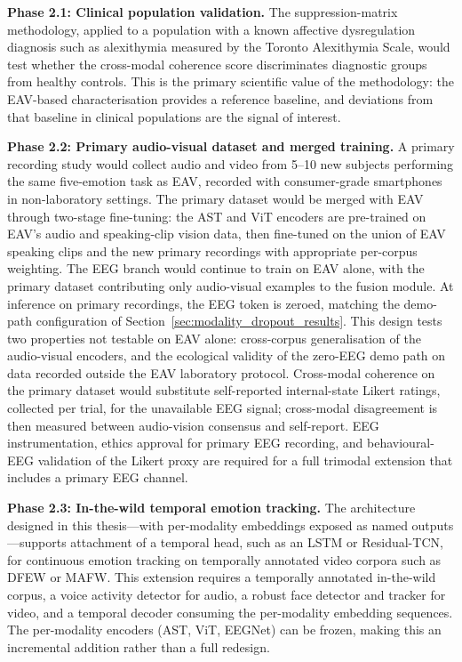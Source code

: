 \textbf{Phase 2.1: Clinical population validation.} The suppression-matrix methodology, applied to a population with a known affective dysregulation diagnosis such as alexithymia measured by the Toronto Alexithymia Scale, would test whether the cross-modal coherence score discriminates diagnostic groups from healthy controls. This is the primary scientific value of the methodology: the EAV-based characterisation provides a reference baseline, and deviations from that baseline in clinical populations are the signal of interest.

\textbf{Phase 2.2: Primary audio-visual dataset and merged training.} A primary recording study would collect audio and video from 5--10 new subjects performing the same five-emotion task as EAV, recorded with consumer-grade smartphones in non-laboratory settings. The primary dataset would be merged with EAV through two-stage fine-tuning: the AST and ViT encoders are pre-trained on EAV's audio and speaking-clip vision data, then fine-tuned on the union of EAV speaking clips and the new primary recordings with appropriate per-corpus weighting. The EEG branch would continue to train on EAV alone, with the primary dataset contributing only audio-visual examples to the fusion module. At inference on primary recordings, the EEG token is zeroed, matching the demo-path configuration of Section~\ref{sec:modality_dropout_results}. This design tests two properties not testable on EAV alone: cross-corpus generalisation of the audio-visual encoders, and the ecological validity of the zero-EEG demo path on data recorded outside the EAV laboratory protocol. Cross-modal coherence on the primary dataset would substitute self-reported internal-state Likert ratings, collected per trial, for the unavailable EEG signal; cross-modal disagreement is then measured between audio-vision consensus and self-report. EEG instrumentation, ethics approval for primary EEG recording, and behavioural-EEG validation of the Likert proxy are required for a full trimodal extension that includes a primary EEG channel.

\textbf{Phase 2.3: In-the-wild temporal emotion tracking.} The architecture designed in this thesis---with per-modality embeddings exposed as named outputs---supports attachment of a temporal head, such as an LSTM or Residual-TCN, for continuous emotion tracking on temporally annotated video corpora such as DFEW or MAFW. This extension requires a temporally annotated in-the-wild corpus, a voice activity detector for audio, a robust face detector and tracker for video, and a temporal decoder consuming the per-modality embedding sequences. The per-modality encoders (AST, ViT, EEGNet) can be frozen, making this an incremental addition rather than a full redesign.

